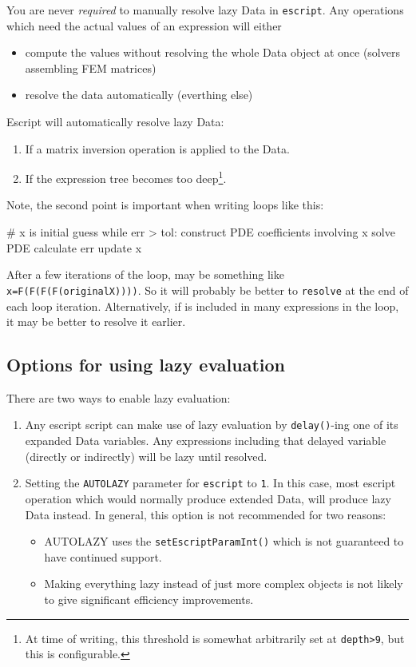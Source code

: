You are never \emph{required} to manually resolve lazy Data in \texttt{escript}.
Any operations which need the actual values of an expression will either
\begin{itemize}
 \item compute the values without resolving the whole Data object at once (solvers assembling FEM matrices)
 \item resolve the data automatically (everthing else)
\end{itemize}

\noindent Escript will automatically resolve lazy Data:
\begin{enumerate}
 \item If a matrix inversion operation is applied to the Data.
 \item If the expression tree becomes too deep\footnote{At time of writing, this threshold is somewhat arbitrarily set at \texttt{depth>9}, but this is configurable.}.
\end{enumerate}
Note, the second point is important when writing loops like this:
\begin{python}
# x is initial guess
while err > tol:
  construct PDE coefficients involving x
  solve PDE
  calculate err
  update x
\end{python}

After a few iterations of the loop,  may be something like \texttt{x=F(F(F(F(originalX))))}.
So it will probably be better to \texttt{resolve}  at the end of each loop iteration.
Alternatively, if  is included in many expressions in the loop, it may be better to resolve it earlier.

\subsection{Options for using lazy evaluation}

There are two ways to enable lazy evaluation:
\begin{enumerate}
 \item Any escript script can make use of lazy evaluation by \texttt{delay()}-ing one of its expanded Data variables.
Any expressions including that delayed variable (directly or indirectly) will be lazy until resolved.
 \item Setting the \texttt{AUTOLAZY} parameter for \texttt{escript} to \texttt{1}.
 In this case, most escript operation which would normally produce extended Data, will produce lazy Data instead.
 In general, this option is not recommended for two reasons:
 \begin{itemize}
  \item AUTOLAZY uses the \texttt{setEscriptParamInt()} which is not guaranteed to have continued support.
  \item Making everything lazy instead of just more complex objects is not likely to give significant efficiency improvements.
 \end{itemize}
\end{enumerate}

